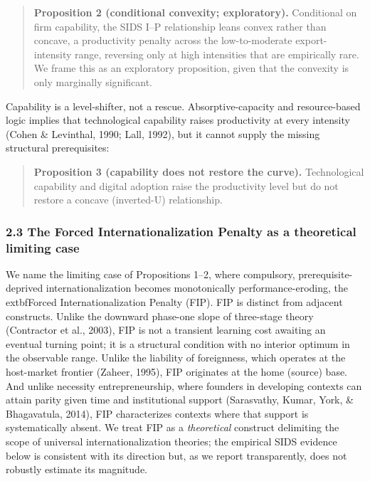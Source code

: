 \documentclass[
  12pt,a4paper]{article}
\begin{document}
\begin{quote}
\textbf{Proposition 2 (conditional convexity; exploratory).} Conditional
on firm capability, the SIDS I--P relationship leans convex rather than
concave, a productivity penalty across the low-to-moderate
export-intensity range, reversing only at high intensities that are
empirically rare. We frame this as an exploratory proposition, given
that the convexity is only marginally significant.
\end{quote}

Capability is a level-shifter, not a rescue. Absorptive-capacity and
resource-based logic implies that technological capability raises
productivity at every intensity (Cohen \& Levinthal, 1990; Lall, 1992),
but it cannot supply the missing structural prerequisites:

\begin{quote}
\textbf{Proposition 3 (capability does not restore the curve).}
Technological capability and digital adoption raise the productivity
level but do not restore a concave (inverted-U) relationship.
\end{quote}

\hypertarget{the-forced-internationalization-penalty-as-a-theoretical-limiting-case}{%
\subsubsection{2.3 The Forced Internationalization Penalty as a
theoretical limiting
case}\label{the-forced-internationalization-penalty-as-a-theoretical-limiting-case}}

We name the limiting case of Propositions 1--2, where compulsory,
prerequisite-deprived internationalization becomes monotonically
performance-eroding, the 	extbf{Forced Internationalization Penalty
(FIP)}. FIP is distinct from adjacent constructs. Unlike the downward
phase-one slope of three-stage theory (Contractor et al., 2003), FIP is
not a transient learning cost awaiting an eventual turning point; it is
a structural condition with no interior optimum in the observable range.
Unlike the liability of foreignness, which operates at the host-market
frontier (Zaheer, 1995), FIP originates at the home (source) base. And
unlike necessity entrepreneurship, where founders in developing contexts
can attain parity given time and institutional support (Sarasvathy,
Kumar, York, \& Bhagavatula, 2014), FIP characterizes contexts where
that support is systematically absent. We treat FIP as a
\emph{theoretical} construct delimiting the scope of universal
internationalization theories; the empirical SIDS evidence below is
consistent with its direction but, as we report transparently, does not
robustly estimate its magnitude.
\end{document}
